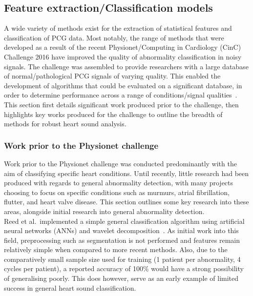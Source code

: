 \documentclass[titlepage, 12pt]{scrartcl} \usepackage{enumitem}
\begin{document}
\doublespacing

\subsection{Feature extraction/Classification models}\label{Classification}

A wide variety of methods exist for the extraction of statistical features and
classification of PCG data. Most notably, the range of methods that were
developed as a result of the recent Physionet/Computing in Cardiology (CinC)
Challenge 2016 have improved the quality of abnormality classification in
noisy signals. The challenge was assembled to provide researchers with a large
database of normal/pathological PCG signals of varying quality. This enabled
the development of algorithms that could be evaluated on a significant
database, in order to determine performance across a range of conditions/signal
qualities~\parencite{Clifford2016}. This section first details significant work
produced prior to the challenge, then highlights key works produced for the
challenge to outline the breadth of methods for robust heart sound analysis.

\subsubsection{Work prior to the Physionet challenge}
Work prior to the Physionet challenge was conducted predominantly with the aim
of classifying specific heart conditions. Until recently, little research had
been produced with regards to general abnormality detection, with many projects
choosing to focus on specific conditions such as murmurs, atrial fibrillation,
flutter, and heart valve disease. This section outlines some key research
into these areas, alongside initial research into general abnormality
detection.\\

Reed et al.\ implemented a simple general classification algorithm using
artificial neural networks (ANNs) and wavelet
decomposition~\parencite{Reed2004}. As initial work into this field,
preprocessing such as segmentation is not performed and features remain
relatively simple when compared to more recent methods. Also, due to the
comparatively small sample size used for training (1 patient per abnormality, 4
cycles per patient), a reported accuracy of 100\% would have a strong
possibility of generalising poorly. This does however, serve as an early
example of limited success in general heart sound classification.\\
\end{document}
